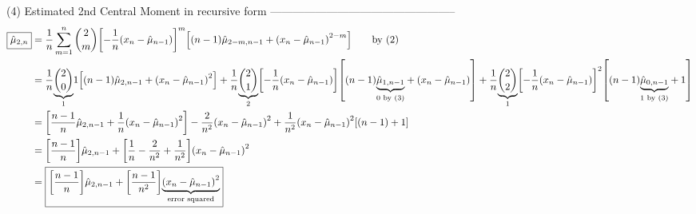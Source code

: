 (4) Estimated 2nd Central Moment in recursive form
--------------------------------------------------
\begin{align*}
\boxed{\hat{\mu}_{2,n}}
  &= \frac{1}{n}\sum_{m=1}^n {2\choose m} {\left[ -\frac{1}{n}{\left(x_n-\hat{\mu}_{n-1}\right)} \right]}^m {\left[ (n-1) \hat{\mu}_{2-m,n-1} + {\left( x_n - \hat{\mu}_{n-1} \right)}^{2-m} \right]}
     \qquad\text{by (2)}
  \\&= \frac{1}{n}{\displaystyle\underbrace{\displaystyle{2\choose0}}_{\text{1}}} 1 {\left[ (n-1) \hat{\mu}_{2,n-1} + {\left( x_n - \hat{\mu}_{n-1} \right)}^{2} \right]} 
     + \frac{1}{n}{\displaystyle\underbrace{\displaystyle{2\choose1}}_{\text{2}}} {\left[ -\frac{1}{n}{\left(x_n-\hat{\mu}_{n-1}\right)} \right]}{\left[ (n-1) {\displaystyle\underbrace{\displaystyle\hat{\mu}_{1,n-1}}_{\text{0 by (3)}}} + {\left( x_n - \hat{\mu}_{n-1} \right)} \right]} 
     + \frac{1}{n}{\displaystyle\underbrace{\displaystyle{2\choose2}}_{\text{1}}} {\left[ -\frac{1}{n}{\left(x_n-\hat{\mu}_{n-1}\right)} \right]}^2 {\left[ (n-1) {\displaystyle\underbrace{\displaystyle\hat{\mu}_{0,n-1}}_{\text{1 by (3)}}} + 1 \right]}
  \\&= {\left[\frac{n-1}{n} \hat{\mu}_{2,n-1}
     + \frac{1}{n}{\left( x_n - \hat{\mu}_{n-1} \right)}^2\right]}
     -\frac{2}{n^2} {\left( x_n - \hat{\mu}_{n-1} \right)}^2 +\frac{1}{n^2} {\left( x_n - \hat{\mu}_{n-1} \right)}^2 {\left[ (n-1) + 1 \right]}
  \\&= {\left[\frac{n-1}{n}\right]}\hat{\mu}_{2,n-1} + {\left[ \frac{1}{n} - \frac{2}{n^2} + \frac{1}{n^2} \right]} {\left( x_n - \hat{\mu}_{n-1} \right)}^2
  \\&= \boxed{{\left[\frac{n-1}{n}\right]}\hat{\mu}_{2,n-1} + {\left[ \frac{n-1}{n^2} \right]} {\displaystyle\underbrace{\displaystyle{\left( x_n - \hat{\mu}_{n-1} \right)}^2}_{\text{error squared}}}}
\end{align*}

